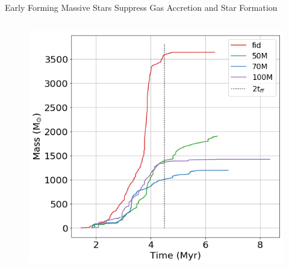 \documentclass[aspectratio=169]{beamer}
\begin{document}
\begin{frame}{Early Forming Massive Stars Suppress Gas Accretion and Star Formation}{}
\begin{columns}
\begin{column}{0.45\textwidth}
\begin{figure}[h!]
                \includegraphics[width=\linewidth]{../images/cumulative_stellar_mass_fixes.png} \\
                \label{fig:cum_mass}
            \end{figure}
        \end{column}
    \end{columns}
\end{frame} 
\end{document}
